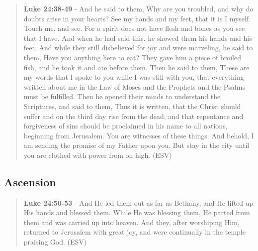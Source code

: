 \documentclass[11pt]{article}
\begin{document}
\begin{quote}
\textbf{Luke 24:38-49} - And he said to them, Why are you troubled, and why do doubts arise in your hearts? See my hands and my feet, that it is I myself. Touch me, and see. For a spirit does not have flesh and bones as you see that I have. And when he had said this, he showed them his hands and his feet. And while they still disbelieved for joy and were marveling, he said to them, Have you anything here to eat? They gave him a piece of broiled fish, and he took it and ate before them. Then he said to them, These are my words that I spoke to you while I was still with you, that everything written about me in the Law of Moses and the Prophets and the Psalms must be fulfilled. Then he opened their minds to understand the Scriptures, and said to them, Thus it is written, that the Christ should suffer and on the third day rise from the dead, and that repentance and forgiveness of sins should be proclaimed in his name to all nations, beginning from Jerusalem. You are witnesses of these things. And behold, I am sending the promise of my Father upon you. But stay in the city until you are clothed with power from on high. (ESV)
\end{quote}

\subsection{Ascension}
\label{sec:orgc3e252f}
\begin{quote}
\textbf{Luke 24:50-53} - And He led them out as far as Bethany, and He lifted up His hands and blessed them. While He was blessing them, He parted from them and was carried up into heaven. And they, after worshiping Him, returned to Jerusalem with great joy, and were continually in the temple praising God. (ESV)
\end{quote}
\end{document}
